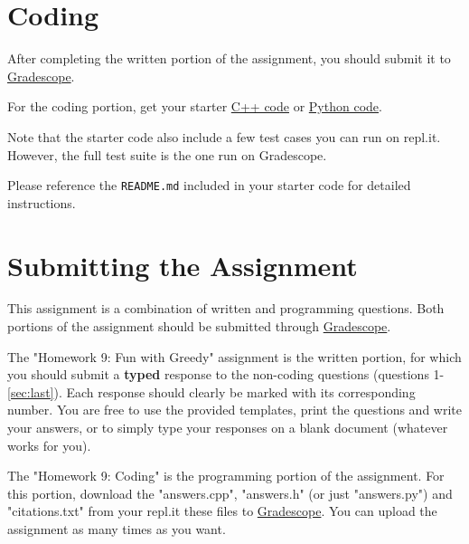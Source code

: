 \documentclass [12pt]{article}
\begin{document}
\section{Coding }
After completing the written portion of the assignment, you should submit it to \href{https://www.gradescope.com/courses/350304}{Gradescope}.

For the coding portion, get your starter \href{https://replit.com/team/COMP285/HW10-Code}{C++ code} or \href{https://replit.com/team/COMP285/HW10-Code-Python}{Python code}.

Note that the starter code also include a few test cases you can run on repl.it. However, the full test suite is the one run on Gradescope.

Please reference the \texttt{README.md} included in your starter code for detailed instructions.

\section*{Submitting the Assignment}

This assignment is a combination of written and programming questions. Both portions of the assignment should be submitted through \href{https://www.gradescope.com/courses/350304}{Gradescope}.

The "Homework 9: Fun with Greedy" assignment is the written portion, for which you should submit a \textbf{typed} response to the non-coding questions (questions 1-\ref{sec:last}). Each response should clearly be marked with its corresponding number. You are free to use the provided templates, print the questions and write your answers, or to simply type your responses on a blank document (whatever works for you).

The "Homework 9: Coding" is the programming portion of the assignment. For this portion, download the "answers.cpp", "answers.h" (or just "answers.py") and "citations.txt" from your repl.it these files to \href{https://www.gradescope.com/courses/350304}{Gradescope}. You can upload the assignment as many times as you want.
\end{document}

